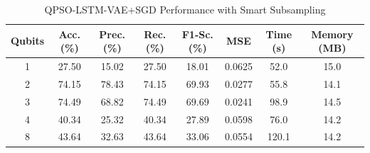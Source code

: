 
\begin{table}[htbp]
\centering
\caption{QPSO-LSTM-VAE+SGD Performance with Smart Subsampling}
\label{tab:qubit_ablation_subsampled}
\begin{tabular}{|c|c|c|c|c|c|c|c|}
\hline
\textbf{Qubits} & \textbf{Acc. (\%)} & \textbf{Prec. (\%)} & \textbf{Rec. (\%)} & \textbf{F1-Sc. (\%)} & \textbf{MSE} & \textbf{Time (s)} & \textbf{Memory (MB)} \\
\hline
1 & 27.50 & 15.02 & 27.50 & 18.01 & 0.0625 & 52.0 & 15.0 \\
2 & 74.15 & 78.43 & 74.15 & 69.93 & 0.0277 & 55.8 & 14.1 \\
3 & 74.49 & 68.82 & 74.49 & 69.69 & 0.0241 & 98.9 & 14.5 \\
4 & 40.34 & 25.32 & 40.34 & 27.89 & 0.0598 & 76.0 & 14.2 \\
8 & 43.64 & 32.63 & 43.64 & 33.06 & 0.0554 & 120.1 & 14.2 \\
\hline
\end{tabular}
\end{table}
